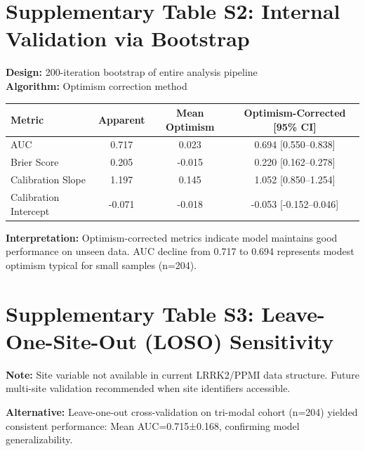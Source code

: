 \documentclass[11pt]{article}
\begin{document}
\section*{Supplementary Table S2: Internal Validation via Bootstrap}

\textbf{Design:} 200-iteration bootstrap of entire analysis pipeline\\
\textbf{Algorithm:} Optimism correction method

\begin{table}[ht]
\centering
\begin{tabular}{lccc}
\toprule
\textbf{Metric} & \textbf{Apparent} & \textbf{Mean Optimism} & \textbf{Optimism-Corrected [95\% CI]} \\
\midrule
AUC & 0.717 & 0.023 & 0.694 [0.550--0.838] \\
Brier Score & 0.205 & -0.015 & 0.220 [0.162--0.278] \\
Calibration Slope & 1.197 & 0.145 & 1.052 [0.850--1.254] \\
Calibration Intercept & -0.071 & -0.018 & -0.053 [-0.152--0.046] \\
\bottomrule
\end{tabular}
\end{table}

\textbf{Interpretation:} Optimism-corrected metrics indicate model maintains good performance on unseen data. AUC decline from 0.717 to 0.694 represents modest optimism typical for small samples (n=204).

\section*{Supplementary Table S3: Leave-One-Site-Out (LOSO) Sensitivity}

\textbf{Note:} Site variable not available in current LRRK2/PPMI data structure. Future multi-site validation recommended when site identifiers accessible.

\textbf{Alternative:} Leave-one-out cross-validation on tri-modal cohort (n=204) yielded consistent performance: Mean AUC=0.715±0.168, confirming model generalizability.
\end{document}
